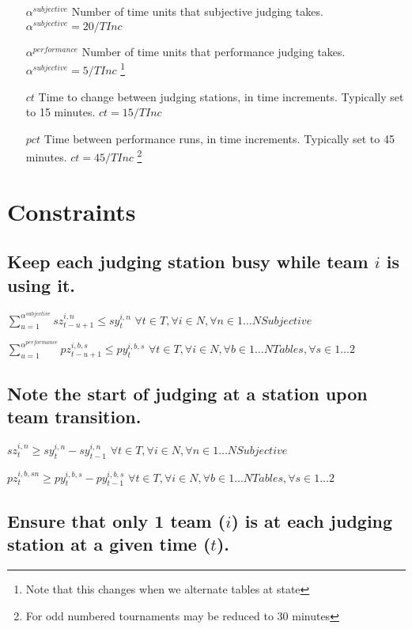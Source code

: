 \documentclass[letterpaper,11pt]{report}
\newcommand{\doccomment}[3]%
{\marginpar{\textcolor{#2}{\bf #1}}%
\footnote{{\color{#2}#3}}%
}
\newcommand{\doccomment}[3]{}
\newcommand{\jpscomment}[1]%
{\doccomment{SCHEWE}{Bittersweet}{#1}}
\begin{document}
\begin{itemize}
\item[$\alpha^{subjective}$] Number of time units that subjective judging
  takes. $\alpha^{subjective} = 20 / TInc$

\item[$\alpha^{performance}$] Number of time units that performance judging
  takes. $\alpha^{subjective} = 5 / TInc$ \jpscomment{Note that this
changes when we alternate tables at state}

\item[$ct$] Time to change between judging stations, in time increments. Typically set to 15
  minutes. $ct = 15/TInc$
\item[$pct$] Time between performance runs, in time increments. Typically set to 45
  minutes. $ct = 45/TInc$ \jpscomment{For odd numbered tournaments may be reduced to 30
    minutes}


\end{itemize}

\section{Constraints}

\subsection{Keep each judging station busy while team $i$ is using it.}

$\sum\limits_{u=1}^{\alpha^{subjective}} sz_{t-u+1}^{i,n} \le sy_{t}^{i,n}$
\hfill $\forall t \in T,  \forall i \in N,
\forall n \in 1 \dots NSubjective$

$\sum\limits_{u=1}^{\alpha^{performance}} pz_{t-u+1}^{i,b,s} \le py_{t}^{i,b,s}$
\hfill $\forall t \in T, \forall i \in N, \forall b \in 1 \dots NTables,
\forall s \in 1 \dots 2$


\subsection{Note the start of judging at a station upon team transition.}
$sz_{t}^{i,n} \ge sy_{t}^{i,n} - sy_{t-1}^{i,n}$
\hfill $\forall t \in T, \forall i \in N,
\forall n \in 1 \dots NSubjective$

$pz_{t}^{i,b,sn} \ge py_{t}^{i,b,s} - py_{t-1}^{i,b,s}$
\hfill $\forall t \in T, \forall i \in N, \forall b \in 1 \dots NTables,
\forall s \in 1 \dots 2$


\subsection{Ensure that only 1 team ($i$) is at each judging station at a
given time ($t$).}
\end{document}
